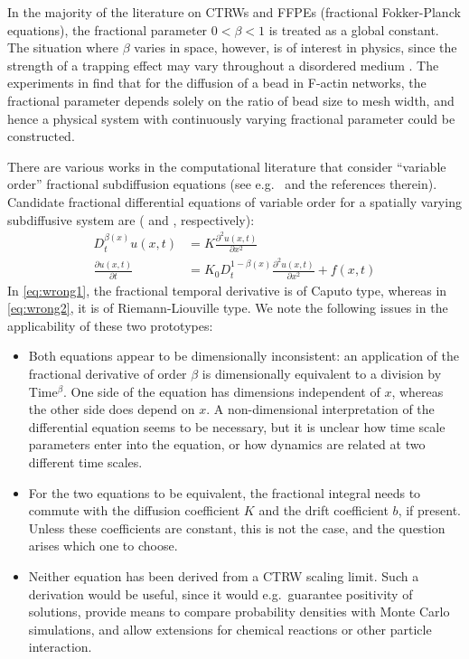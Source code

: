 \documentclass[a4paper,12pt]{elsarticle}
\numberwithin{equation}{section}
\theoremstyle{plain}
\theoremstyle{definition}
\theoremstyle{remark}
\numberwithin{equation}{section}
\newcommand{\1}{\mathbf 1}
\begin{document}
In the majority of the literature on CTRWs and FFPEs (fractional Fokker-Planck
equations), the
fractional parameter $0 < \beta < 1$ is treated as a global constant.  The
situation where $\beta$ varies in space, however, is of interest in physics,
since the strength of a trapping effect may vary throughout a disordered
medium
\citep{Chechkin2005a,Korabel2010,Stickler2011,Fedotov2012,StrakaFedotov14}.
The experiments in \citep{Wong04} find that for the diffusion of a bead in
F-actin networks, the fractional parameter depends solely on the ratio of
bead size to mesh width, and hence a physical system with continuously varying
fractional parameter could be constructed.

There are various works in the computational literature that consider ``variable
order'' fractional subdiffusion equations (see e.g.\ \citep{Chen2010,Sun2009} and
the references therein). Candidate fractional differential equations of
variable order for a spatially varying subdiffusive system are (\citep[Eq.(8)]{Sun2009} and \citep[Eq.(1.2)]{Chen2010}, respectively):
\begin{align}
\label{eq:wrong1}
  D_t^{\beta(x)} u(x,t) &= K \frac{\partial^2 u(x,t)}{\partial x^2}
  \\
  \label{eq:wrong2}
  \frac{\partial u(x,t)}{\partial t} &= K {_0 D_t^{1-\beta(x)}}
  \frac{\partial^2 u(x,t)}{\partial x^2} + f(x,t)
\end{align}
In \eqref{eq:wrong1}, the fractional temporal derivative is of Caputo type,
whereas in \eqref{eq:wrong2}, it is of Riemann-Liouville type.
We note the following issues in the applicability of these two prototypes:
\begin{itemize}
  \item
  Both equations appear to be dimensionally inconsistent: an application of the
  fractional derivative of order $\beta$ is dimensionally equivalent to a
  division by Time$^{\beta}$. One side of the equation has dimensions
  independent of $x$, whereas the other side does depend on $x$.  A
  non-dimensional interpretation of the differential equation seems to be
  necessary, but it is unclear how time scale parameters enter into the
  equation, or how dynamics are related at two different time scales.
  \item
  For the two equations to be equivalent, the fractional integral needs to
  commute with the diffusion coefficient $K$ and the drift coefficient $b$,
  if present.  Unless these coefficients are constant, this is not the case,
  and the question arises which one to choose.
  \item
  Neither equation has been derived from a CTRW scaling limit. Such a derivation
  would be useful, since it would e.g.\ guarantee positivity of solutions,
  provide means to compare probability densities with Monte Carlo simulations,
  and allow extensions for chemical reactions or other particle interaction.
\end{itemize}
\end{document}
